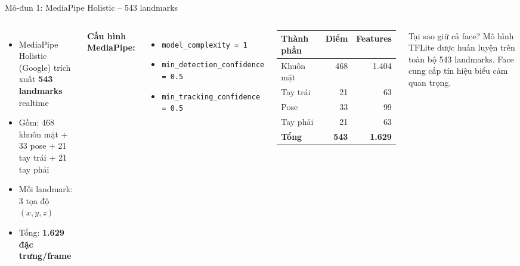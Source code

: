 ﻿\documentclass[aspectratio=169, 11pt]{beamer}
\begin{document}
\begin{frame}{Mô-đun 1: MediaPipe Holistic -- 543 landmarks}
    \begin{columns}[T]
        \begin{itemize}
            \item MediaPipe Holistic (Google) trích xuất \textbf{543 landmarks} realtime
            \item Gồm: 468 khuôn mặt + 33 pose + 21 tay trái + 21 tay phải
            \item Mỗi landmark: 3 tọa độ $(x, y, z)$
            \item Tổng: \textbf{1.629 đặc trưng/frame}
        \end{itemize}

        \vspace{0.2cm}
        \small\textbf{Cấu hình MediaPipe:}
        \begin{itemize}\small
            \item \texttt{model\_complexity = 1}
            \item \texttt{min\_detection\_confidence = 0.5}
            \item \texttt{min\_tracking\_confidence = 0.5}
        \end{itemize}

        \centering
        \begin{tabular}{>{\small}l >{\small}r >{\small}r}
            \toprule
            \textbf{Thành phần} & \textbf{Điểm} & \textbf{Features} \\
            \midrule
            Khuôn mặt & 468 & 1.404 \\
            Tay trái & 21 & 63 \\
            Pose & 33 & 99 \\
            Tay phải & 21 & 63 \\
            \midrule
            \textbf{Tổng} & \textbf{543} & \textbf{1.629} \\
            \bottomrule
        \end{tabular}

        \vspace{0.3cm}
        \begin{alertblock}{\small Tại sao giữ cả face?}
            \scriptsize Mô hình TFLite được huấn luyện trên toàn bộ 543 landmarks. Face cung cấp tín hiệu biểu cảm quan trọng.
        \end{alertblock}
    \end{columns}
\end{frame}
\end{document}
